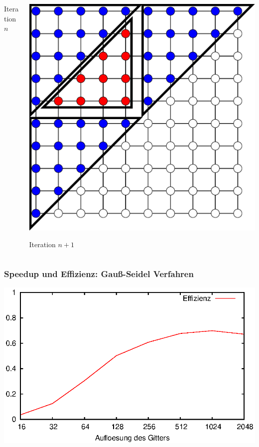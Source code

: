 \documentclass{beamer}
\begin{document}
\begin{frame}
\begin{columns}
\begin{column}{0.5\textwidth}
            \centering Iteration $n$
        \end{column}
        \begin{column}{0.5\textwidth}
            \includegraphics[width=\textwidth]{triangles2}
            
            \centering Iteration $n+1$
        \end{column}
    \end{columns}
\end{frame}

\begin{frame}
    \frametitle{Speedup und Effizienz: Gauß-Seidel Verfahren}
    \includegraphics[width=\textwidth]{plots/effizienzgaussseidel}
\end{frame}
\end{document}
